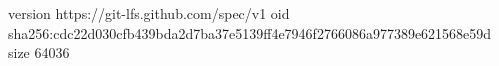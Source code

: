 version https://git-lfs.github.com/spec/v1
oid sha256:cdc22d030cfb439bda2d7ba37e5139ff4e7946f2766086a977389e621568e59d
size 64036
